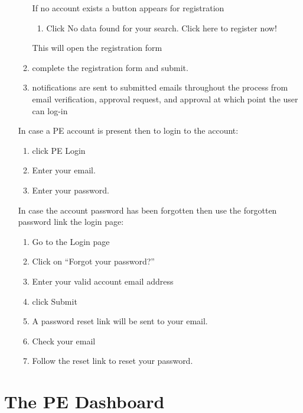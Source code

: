 \documentclass [12pt]{book}
\begin{document}
\begin{enumerate}
\begin{enumerate}
        If no account exists a button appears for registration
        \begin{enumerate}
            \item Click No data found for your search. Click here to register now!
        \end{enumerate}

        This will open the registration form\\
        \item complete the registration form and submit.
        \item notifications are sent to submitted emails throughout the process from email verification, approval request, and approval at which point the user can log-in
    \end{enumerate}


In case a PE account is present then to login to the account:\\ 

    \begin{enumerate}
        \item click PE Login
        \item Enter your email.
        \item Enter your password.
    \end{enumerate}

In case the account password has been forgotten then use the forgotten password link the login page:

    \begin{enumerate}
        \item	Go to the Login page 
        \item	Click on “Forgot your password?”
        \item	Enter your valid account email address 
        \item	click Submit
        \item	A password reset link will be sent to your email.
        \item	Check your email 
        \item	Follow the reset link to reset your password.
    \end{enumerate}

\end{enumerate}
\clearpage

\chapter{The PE Dashboard}
\end{document}
